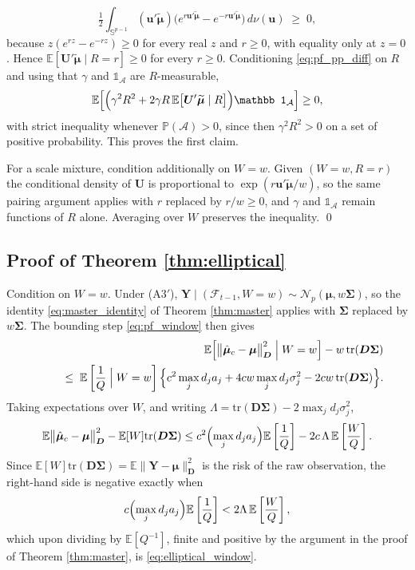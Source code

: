 \documentclass[pdflatex,sn-mathphys-num]{sn-jnl}%
\theoremstyle{thmstyleone}%
\theoremstyle{thmstyletwo}%
\theoremstyle{thmstylethree}%
\newcommand{\tr}{\mathrm{tr}}
\newcommand{\E}{\mathbb{E}}
\begin{document}
\begin{appendices}
\begin{equation}
\tfrac12\int_{\mathbb S^{p-1}}(\bm u'\widetilde{\bm\mu})\bigl(e^{r\bm u'\widetilde{\bm\mu}}-e^{-r\bm u'\widetilde{\bm\mu}}\bigr)\,d\nu(\bm u)
\;\ge\;0,
\end{equation}
because $z(e^{rz}-e^{-rz})\ge0$ for every real $z$ and $r\ge0$, with equality only at $z=0$. Hence $\E[\bm U'\widetilde{\bm\mu}\mid R=r]\ge0$ for every $r\ge0$. Conditioning \eqref{eq:pf_pp_diff} on $R$ and using that $\gamma$ and $\mathbb 1_{\mathcal A}$ are $R$-measurable,
\begin{equation}
\E\Bigl[\Bigl(\gamma^{2}R^{2}+2\gamma R\,\E\bigl[\bm U'\widetilde{\bm\mu}\mid R\bigr]\Bigr)\mathbb 1_{\mathcal A}\Bigr]\ge0 ,
\end{equation}
with strict inequality whenever $\mathbb P(\mathcal A)>0$, since then $\gamma^2R^2>0$ on a set of positive probability. This proves the first claim.

For a scale mixture, condition additionally on $W=w$. Given $(W=w,R=r)$ the conditional density of $\bm U$ is proportional to $\exp(r\bm u'\widetilde{\bm\mu}/w)$, so the same pairing argument applies with $r$ replaced by $r/w\ge0$, and $\gamma$ and $\mathbb 1_{\mathcal A}$ remain functions of $R$ alone. Averaging over $W$ preserves the inequality. \qed

\subsection*{Proof of Theorem \ref{thm:elliptical}}

Condition on $W=w$. Under (A3$'$), $\bm Y\mid(\mathcal F_{t-1},W=w)\sim\mathcal N_p(\bm\mu,w\bm\Sigma)$, so the identity \eqref{eq:master_identity} of Theorem \ref{thm:master} applies with $\bm\Sigma$ replaced by $w\bm\Sigma$. The bounding step \eqref{eq:pf_window} then gives
\begin{eqnarray}
&&\E\Bigl[\bigl\|\hat{\bm\mu}_c-\bm\mu\bigr\|^2_{\bm D}\Bigm| W=w\Bigr]-w\,\tr(\bm D\bm\Sigma)
\cr
&&\qquad\le\;
\E\left[\frac1Q\Bigm| W=w\right]
\Bigl\{
c^{2}\max_j d_ja_j+4cw\max_jd_j\sigma^2_j-2cw\,\tr(\bm D\bm\Sigma)
\Bigr\}.
\end{eqnarray}
Taking expectations over $W$, and writing $\Lambda=\tr(\bm D\bm\Sigma)-2\max_jd_j\sigma^2_j$,
\begin{equation}
\E\bigl\|\hat{\bm\mu}_c-\bm\mu\bigr\|^2_{\bm D}-\E[W]\tr(\bm D\bm\Sigma)
\le
c^{2}\Bigl(\max_jd_ja_j\Bigr)\E\left[\frac1Q\right]
-2c\,\Lambda\,\E\left[\frac{W}{Q}\right].
\end{equation}
Since $\E[W]\tr(\bm D\bm\Sigma)=\E\|\bm Y-\bm\mu\|^2_{\bm D}$ is the risk of the raw observation, the right-hand side is negative exactly when
\begin{equation}
c\Bigl(\max_jd_ja_j\Bigr)\E\left[\frac1Q\right]<2\Lambda\,\E\left[\frac WQ\right],
\end{equation}
which upon dividing by $\E[Q^{-1}]$, finite and positive by the argument in the proof of Theorem \ref{thm:master}, is \eqref{eq:elliptical_window}.


\end{appendices}
\end{document}
